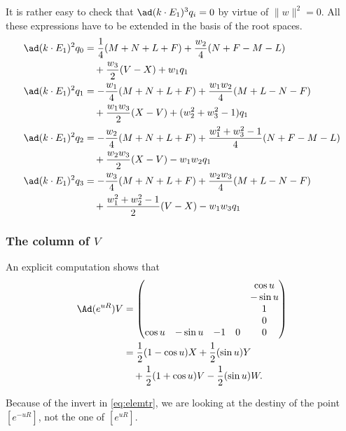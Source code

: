 It is rather easy to check that $\ad(k\cdot E_1)^3q_i=0$ by virtue of $\|w\|^2=0$. All these expressions have to be extended in the basis of the root spaces.
\begin{equation}
\begin{split}
\ad(k\cdot E_1)^2q_0 &=\frac{1}{4}(M+N+L+F)+\frac{w_2}{4}(N+F-M-L)\\
                     &\quad +\frac{w_3}{2}(V-X)+w_1q_1\\
\ad(k\cdot E_1)^2q_1 &=-\frac{w_1}{4}(M+N+L+F)+ \frac{w_1w_2}{4}(M+L-N-F)\\
                     &\quad +\frac{w_1w_3}{2}(X-V) +(w_2^2+w_3^2-1)q_1\\
\ad(k\cdot E_1)^2q_2 &=-\frac{w_2}{4}(M+N+L+F)+\frac{w_1^2+w_3^2-1}{4}(N+F-M-L)\\
                     &\quad +\frac{w_2w_3}{2} (X-V)-w_1w_2q_1\\
\ad(k\cdot E_1)^2q_3 &= -\frac{w_3}{4}(M+N+L+F) +\frac{w_2w_3}{4}(M+L-N-F)\\
                     &\quad +\frac{w_1^2+w_2^2-1}{2}(V-X)-w_1w_3q_1
\end{split}
\end{equation}


\subsubsection{The column of \texorpdfstring{$V$}{V}}

An explicit computation shows that
\begin{equation}
\begin{split}
\Ad(e^{uR})V&=
\begin{pmatrix}
&&&&\cos u\\
&&&&-\sin u\\
&&&&1\\
&&&&0\\
\cos u&-\sin u&-1&0&0
\end{pmatrix}\\
  &=\frac{1}{2}(1-\cos u)X+\frac{1}{2}(\sin u) Y\\
  &\quad+\frac{1}{2}(1+\cos u)V-\frac{1}{2}(\sin u) W.
\end{split}
\end{equation}

\begin{remark}
Because of the invert in \eqref{eq:elemtr}, we are looking at the destiny of the point $[e^{-uR}]$, not the one of $[e^{uR}]$.
\end{remark}

